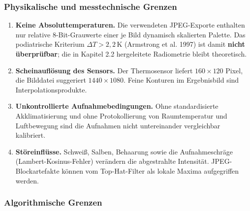 \documentclass[
  11pt,
]{article}
\providecommand{\tightlist}{%
  \setlength{\itemsep}{0pt}\setlength{\parskip}{0pt}}
\begin{document}
\subsubsection{Physikalische und messtechnische
Grenzen}\label{physikalische-und-messtechnische-grenzen}

\begin{enumerate}
\def\labelenumi{\arabic{enumi}.}
\setcounter{enumi}{4}
\tightlist
\item
  \textbf{Keine Absoluttemperaturen.} Die verwendeten JPEG-Exporte
  enthalten nur relative 8-Bit-Grauwerte einer je Bild dynamisch
  skalierten Palette. Das podiatrische Kriterium \(\Delta T > 2{,}2\,\)K
  (Armstrong et al. 1997) ist damit \textbf{nicht überprüfbar}; die in
  Kapitel 2.2 hergeleitete Radiometrie bleibt theoretisch.
\item
  \textbf{Scheinauflösung des Sensors.} Der Thermosensor liefert
  \(160 \times 120\) Pixel, die Bilddatei suggeriert
  \(1440 \times 1080\). Feine Konturen im Ergebnisbild sind
  Interpolationsprodukte.
\item
  \textbf{Unkontrollierte Aufnahmebedingungen.} Ohne standardisierte
  Akklimatisierung und ohne Protokollierung von Raumtemperatur und
  Luftbewegung sind die Aufnahmen nicht untereinander vergleichbar
  kalibriert.
\item
  \textbf{Störeinflüsse.} Schweiß, Salben, Behaarung sowie die
  Aufnahmeschräge (Lambert-Kosinus-Fehler) verändern die abgestrahlte
  Intensität. JPEG-Blockartefakte können vom Top-Hat-Filter als lokale
  Maxima aufgegriffen werden.
\end{enumerate}

\subsubsection{Algorithmische Grenzen}\label{algorithmische-grenzen}
\end{document}
